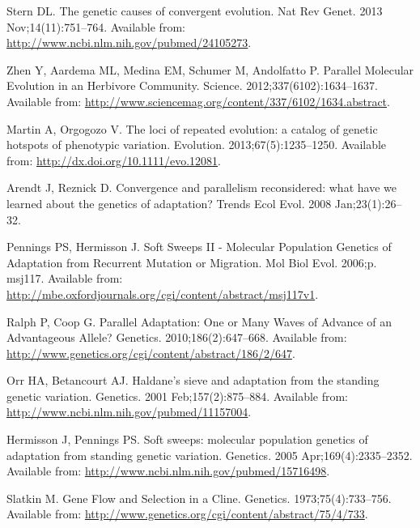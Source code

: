 \documentclass[10pt,letterpaper]{article}
\begin{document}
\nolinenumbers

% 
\begin{thebibliography}{10}

Stern DL.
\newblock The genetic causes of convergent evolution.
\newblock Nat Rev Genet. 2013 Nov;14(11):751--764.
\newblock Available from: \url{http://www.ncbi.nlm.nih.gov/pubmed/24105273}.

Zhen Y, Aardema ML, Medina EM, Schumer M, Andolfatto P.
\newblock Parallel Molecular Evolution in an Herbivore Community.
\newblock Science. 2012;337(6102):1634--1637.
\newblock Available from:
  \url{http://www.sciencemag.org/content/337/6102/1634.abstract}.

Martin A, Orgogozo V.
\newblock The loci of repeated evolution: a catalog of genetic hotspots of
  phenotypic variation.
\newblock Evolution. 2013;67(5):1235--1250.
\newblock Available from: \url{http://dx.doi.org/10.1111/evo.12081}.

Arendt J, Reznick D.
\newblock Convergence and parallelism reconsidered: what have we learned about
  the genetics of adaptation?
\newblock Trends Ecol Evol. 2008 Jan;23(1):26--32.

Pennings PS, Hermisson J.
\newblock Soft Sweeps {II} - Molecular Population Genetics of Adaptation from
  Recurrent Mutation or Migration.
\newblock Mol Biol Evol. 2006;p. msj117.
\newblock Available from:
  \url{http://mbe.oxfordjournals.org/cgi/content/abstract/msj117v1}.

Ralph P, Coop G.
\newblock Parallel Adaptation: One or Many Waves of Advance of an Advantageous
  Allele?
\newblock Genetics. 2010;186(2):647--668.
\newblock Available from:
  \url{http://www.genetics.org/cgi/content/abstract/186/2/647}.

Orr HA, Betancourt AJ.
\newblock Haldane's sieve and adaptation from the standing genetic variation.
\newblock Genetics. 2001 Feb;157(2):875--884.
\newblock Available from: \url{http://www.ncbi.nlm.nih.gov/pubmed/11157004}.

Hermisson J, Pennings PS.
\newblock Soft sweeps: molecular population genetics of adaptation from
  standing genetic variation.
\newblock Genetics. 2005 Apr;169(4):2335--2352.
\newblock Available from: \url{http://www.ncbi.nlm.nih.gov/pubmed/15716498}.

Slatkin M.
\newblock Gene Flow and Selection in a Cline.
\newblock Genetics. 1973;75(4):733--756.
\newblock Available from:
  \url{http://www.genetics.org/cgi/content/abstract/75/4/733}.


\end{thebibliography}
\end{document}
